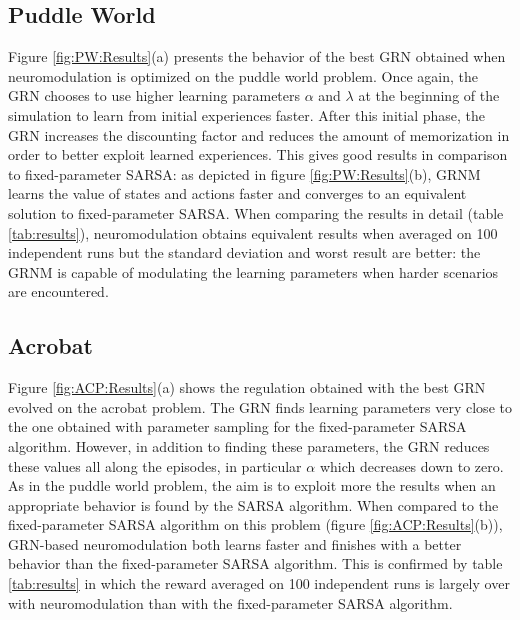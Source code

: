 \subsection{Puddle World}
Figure \ref{fig:PW:Results}(a) presents the behavior of the best GRN obtained when neuromodulation is optimized on the puddle world problem. Once again, the GRN chooses to use higher learning parameters $\alpha$ and $\lambda$ at the beginning of the simulation to learn from initial experiences  faster. After this initial phase, the GRN increases the discounting factor and reduces the amount of memorization in order to better exploit learned experiences. This gives good results in comparison to fixed-parameter SARSA: as depicted in figure \ref{fig:PW:Results}(b), GRNM learns the value of states and actions faster and converges to an equivalent solution to fixed-parameter SARSA. When comparing the results in detail (table \ref{tab:results}), neuromodulation obtains equivalent results when averaged on 100 independent runs but the standard deviation and worst result are better: the GRNM is capable of modulating the learning parameters when harder scenarios are encountered. 

\subsection{Acrobat}

Figure \ref{fig:ACP:Results}(a) shows the regulation obtained with the best GRN evolved on the acrobat problem. The GRN finds learning parameters very close to the one obtained with parameter sampling for the fixed-parameter SARSA algorithm. However, in addition to finding these parameters, the GRN reduces these values all along the episodes, in particular $\alpha$ which decreases down to zero. As in the puddle world problem, the aim is to exploit more the results when an appropriate behavior is found by the SARSA algorithm. When compared to the fixed-parameter SARSA algorithm on this problem (figure \ref{fig:ACP:Results}(b)), GRN-based neuromodulation both learns faster and finishes with a better behavior than the fixed-parameter SARSA algorithm. This is confirmed by table \ref{tab:results} in which the reward averaged on 100 independent runs is largely over with neuromodulation than with the fixed-parameter SARSA algorithm. 


